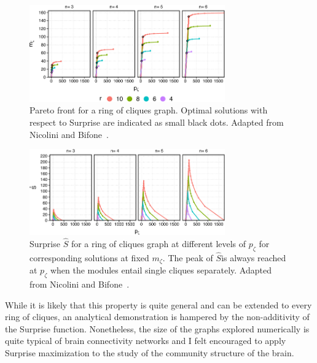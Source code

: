 \begin{figure}[htb!]
\centering
\includegraphics[width=0.75\textwidth]{images/ring_cliques_pareto.pdf}
\caption{Pareto front for a ring of cliques graph. Optimal solutions with respect to Surprise are indicated as small black dots. Adapted from Nicolini and Bifone~\cite{nicolini2016}.}
\label{fig:ring_cliques_pareto}
\end{figure}
\begin{figure}[htb!]
\centering
\includegraphics[width=0.75\textwidth]{images/ring_cliques_surprise.pdf}
\caption{Surprise $\hat{S}$ for a ring of cliques graph at different levels of $p_\zeta$ for corresponding solutions at fixed $m_\zeta$. The peak of $\hat{S} $is always reached at $p_\zeta$ when the modules entail single cliques separately. Adapted from Nicolini and Bifone~\cite{nicolini2016}.}
\label{fig:ring_cliques_surprise}
\end{figure}
While it is likely that this property is quite general and can be extended to every ring of cliques, an analytical demonstration is hampered by the non-additivity of the Surprise function.
Nonetheless, the size of the graphs explored numerically is quite typical of brain connectivity networks and I felt encouraged to apply Surprise maximization to the study of the community structure of the brain.

